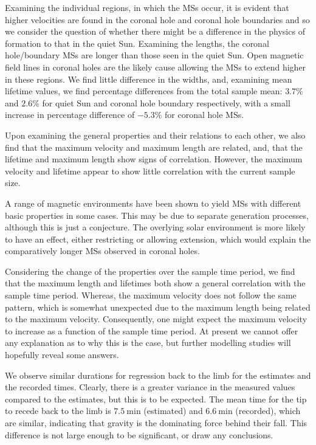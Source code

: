 Examining the individual regions, in which the MSs occur, it is evident that higher velocities are found in the coronal hole and coronal hole boundaries and so we consider the question of whether there might be a difference in the physics of formation to that in the quiet Sun. Examining the lengths, the coronal hole/boundary MSs are longer than those seen in the quiet Sun. Open magnetic field lines in coronal holes are the likely cause allowing the MSs to extend higher in these regions. We find little difference in the widths, and, examining mean lifetime values, we find percentage differences from the total sample mean: $3.7\%$ and $2.6\%$ for quiet Sun and coronal hole boundary respectively, with a small increase in percentage difference of $-5.3\%$ for coronal hole MSs.

Upon examining the general properties and their relations to each other, we also find that the maximum velocity and maximum length are related, and, that the lifetime and maximum length show signs of correlation. However, the maximum velocity and lifetime appear to show little correlation with the current sample size.

A range of magnetic environments have been shown to yield MSs with different basic properties in some cases. This may be due to separate generation processes, although this is just a conjecture. The overlying solar environment is more likely to have an effect, either restricting or allowing extension, which would explain the comparatively longer MSs observed in coronal holes.

Considering the change of the properties over the sample time period, we find that the maximum length and lifetimes both show a general correlation with the sample time period. Whereas, the maximum velocity does not follow the same pattern, which is somewhat unexpected due to the maximum length being related to the maximum velocity. Consequently, one might expect the maximum velocity to increase as a function of the sample time period. At present we cannot offer any explanation as to why this is the case, but further modelling studies will hopefully reveal some answers.

We observe similar durations for regression back to the limb for the estimates and the recorded times. Clearly, there is a greater variance in the measured values compared to the estimates, but this is to be expected. The mean time for the tip to recede back to the limb is $7.5\ \textrm{min}$ (estimated) and $6.6\ \textrm{min}$ (recorded), which are similar, indicating that gravity is the dominating force behind their fall. This difference is not large enough to be significant, or draw any conclusions.

